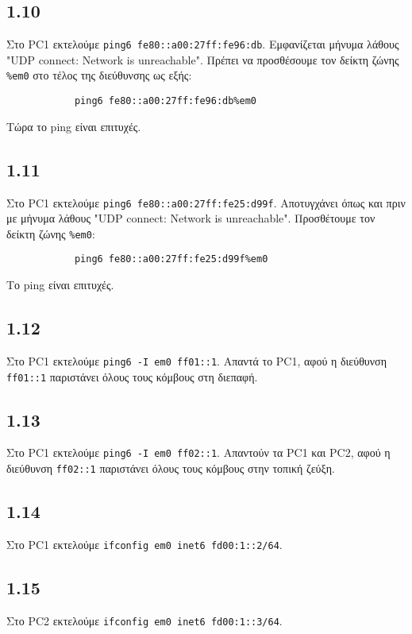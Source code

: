 \documentclass[a4paper, 12pt]{article}
\begin{document}
	\subsection*{1.10}
		Στο PC1 εκτελούμε \verb|ping6 fe80::a00:27ff:fe96:db|. Εμφανίζεται μήνυμα λάθους "UDP connect: Network is unreachable". Πρέπει να προσθέσουμε τον δείκτη ζώνης \verb|%em0| στο τέλος της διεύθυνσης ως εξής:
		
		\begin{verbatim}
			ping6 fe80::a00:27ff:fe96:db%em0
		\end{verbatim}
		
		Τώρα το ping είναι επιτυχές.
	
	\subsection*{1.11}
		Στο PC1 εκτελούμε \verb|ping6 fe80::a00:27ff:fe25:d99f|. Αποτυγχάνει όπως και πριν με μήνυμα λάθους "UDP connect: Network is unreachable". Προσθέτουμε τον δείκτη ζώνης \verb|%em0|:
		
		\begin{verbatim}
			ping6 fe80::a00:27ff:fe25:d99f%em0
		\end{verbatim}
		
		Το ping είναι επιτυχές.
	
	\subsection*{1.12}
		Στο PC1 εκτελούμε \verb|ping6 -I em0 ff01::1|. Απαντά το PC1, αφού η διεύθυνση \verb|ff01::1| παριστάνει όλους τους κόμβους στη διεπαφή.

	\subsection*{1.13}
		Στο PC1 εκτελούμε \verb|ping6 -I em0 ff02::1|. Απαντούν τα PC1 και PC2, αφού η διεύθυνση \verb|ff02::1| παριστάνει όλους τους κόμβους στην τοπική ζεύξη.

	\subsection*{1.14}
		Στο PC1 εκτελούμε \verb|ifconfig em0 inet6 fd00:1::2/64|.

	\subsection*{1.15}
		Στο PC2 εκτελούμε \verb|ifconfig em0 inet6 fd00:1::3/64|.
\end{document}
